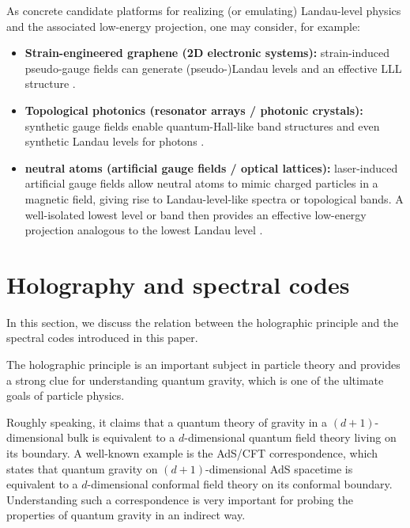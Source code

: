 \documentclass[12pt]{article}
\theoremstyle{definition} %
\theoremstyle{plain} %
\theoremstyle{remark} %
\theoremstyle{underline}
\begin{document}
As concrete candidate platforms for realizing (or emulating) Landau-level physics and the associated low-energy projection, one may consider, for example:
\begin{itemize}
  \item \textbf{Strain-engineered graphene (2D electronic systems):}
  strain-induced pseudo-gauge fields can generate (pseudo-)Landau levels and an
  effective LLL structure \cite{guinea2010energy,vozmediano2010gauge,low2010strain}.
  \item \textbf{Topological photonics (resonator arrays / photonic crystals):}
  synthetic gauge fields enable quantum-Hall-like band structures and even synthetic
  Landau levels for photons \cite{ozawa2019topological,hafezi2011robust}.
  \item \textbf{neutral atoms (artificial gauge fields / optical lattices):}
  laser-induced artificial gauge fields allow neutral atoms to mimic charged particles in a magnetic field, giving rise to Landau-level-like spectra or topological bands.
  A well-isolated lowest level or band then provides an effective low-energy projection analogous to the lowest Landau level \cite{dalibard2011colloquium}.
\end{itemize}


\section{Holography and spectral codes}

In this section, we discuss the relation between the holographic principle \cite{hooft1993dimensional,maldacena1999large,witten1998anti,ryu2006holographic} and the spectral codes introduced in this paper.

The holographic principle is an important subject in particle theory and provides a strong clue for understanding quantum gravity, which is one of the ultimate goals of particle physics.

Roughly speaking, it claims that a quantum theory of gravity in a $(d+1)$-dimensional bulk is equivalent to a $d$-dimensional quantum field theory living on its boundary.
A well-known example is the AdS/CFT correspondence, which states that quantum gravity on $(d+1)$-dimensional AdS spacetime is equivalent to a $d$-dimensional conformal field theory on its conformal boundary.
Understanding such a correspondence is very important for probing the properties of quantum gravity in an indirect way.
\end{document}
